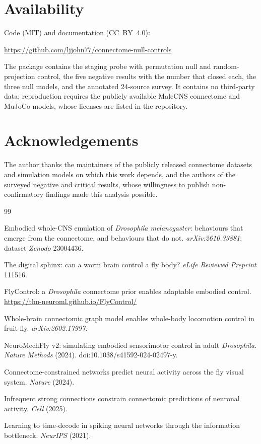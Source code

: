 \documentclass[11pt]{article}
\begin{document}
\section{Availability}

Code (MIT) and documentation (CC~BY~4.0):
\begin{center}
\url{https://github.com/ljjohn77/connectome-null-controls}
\end{center}
The package contains the staging probe with permutation null and
random-projection control, the five negative results with the number that closed
each, the three null models, and the annotated 24-source survey. It contains no
third-party data; reproduction requires the publicly available MaleCNS
connectome and MuJoCo models, whose licenses are listed in the repository.

\section*{Acknowledgements}

The author thanks the maintainers of the publicly released connectome datasets
and simulation models on which this work depends, and the authors of the
surveyed negative and critical results, whose willingness to publish
non-confirmatory findings made this analysis possible.

\begin{thebibliography}{99}

Embodied whole-CNS emulation of \emph{Drosophila melanogaster}: behaviours that
emerge from the connectome, and behaviours that do not.
\emph{arXiv:2610.33881}; dataset \emph{Zenodo} 23004436.

The digital sphinx: can a worm brain control a fly body?
\emph{eLife Reviewed Preprint} 111516.

FlyControl: a \emph{Drosophila} connectome prior enables adaptable embodied
control. \url{https://thu-neuroml.github.io/FlyControl/}

Whole-brain connectomic graph model enables whole-body locomotion control in
fruit fly. \emph{arXiv:2602.17997}.

NeuroMechFly v2: simulating embodied sensorimotor control in adult
\emph{Drosophila}. \emph{Nature Methods} (2024).
doi:10.1038/s41592-024-02497-y.

Connectome-constrained networks predict neural activity across the fly visual
system. \emph{Nature} (2024).

Infrequent strong connections constrain connectomic predictions of neuronal
activity. \emph{Cell} (2025).

Learning to time-decode in spiking neural networks through the information
bottleneck. \emph{NeurIPS} (2021).

\end{thebibliography}
\end{document}
